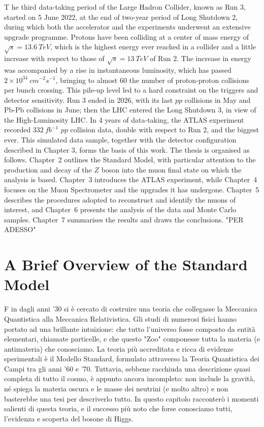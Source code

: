 \documentclass[11pt,a4paper,twoside,openright]{report}
\begin{document}
\lettrine[lines=3,loversize=0.1,lraise=0.05]{T}{} he third data-taking period of the Large Hadron Collider, known as Run 3, started on 5 June 2022, at the end of two-year period of Long Shutdown 2, during which both the accelerator and the experiments underwent an extensive upgrade programme. Protons have been colliding at a center of mass energy of \(\sqrt{s}=13.6\ TeV\), which is the highest energy ever reached in a collider and a little increase with respect to those of \(\sqrt{s}=13\ TeV\) of Run 2.  The increase in energy was accompanied by a rise in instantaneous luminosity, which has passed \(2\times10^{34}\ cm^{-2}s^{-1}\), bringing to almost 60 the number of proton-proton collisions per bunch crossing. This pile-up level led to a hard constraint on the triggers and detector sensitivity. Run 3 ended in 2026, with its last \(pp\) collisions in May and Pb-Pb collisions in June; then the LHC entered the Long Shutdown 3, in view of the High-Luminosity LHC. In 4 years of data-taking, the ATLAS experiment recorded \(332\ fb^{-1}\) \(pp\) collision data, double with respect to Run 2, and the biggest ever. This simulated data sample, together with the detector configuration described in Chapter 3, forms the basis of this work. The thesis is organised as follows. Chapter~2 outlines the Standard Model, with particular attention to the production and decay of the $Z$ boson into the muon final state on which the analysis is based. Chapter~3 introduces the ATLAS experiment, while Chapter~4 focuses on the Muon Spectrometer and the upgrades it has undergone. Chapter~5 describes the procedures adopted to reconstruct and identify the muons of interest, and Chapter~6 presents the analysis of the data and Monte Carlo samples. Chapter~7 summarises the results and draws the conclusions. "PER ADESSO"



\clearpage

\chapter{A Brief Overview of the Standard Model}

\lettrine[lines=3,loversize=0.1,lraise=0.05]{F}{} in dagli anni '30 si è cercato di costruire una teoria che collegasse la Meccanica Quantistica alla Meccanica Relativistica. Gli studi di numerosi fisici hanno portato ad una brillante intuizione: che tutto l'universo fosse composto da entità elementari, chiamate particelle, e che questo "Zoo" componesse tutta la materia (e antimateria) che conosciamo. La teoria più accreditata e ricca di evidenze sperimentali è il Modello Standard, formulato attraverso la Teoria Quantistica dei Campi tra gli anni '60 e '70. Tuttavia, sebbene racchiuda una descrizione quasi completa di tutto il cosmo, è appunto ancora incompleto: non include la gravità, né spiega la materia oscura e le masse dei neutrini (e molto altro) e non basterebbe una tesi per descriverlo tutto. In questo capitolo racconterò i momenti salienti di questa teoria, e il successo più noto che forse conosciamo tutti, l'evidenza e scoperta del bosone di Higgs.
\end{document}
